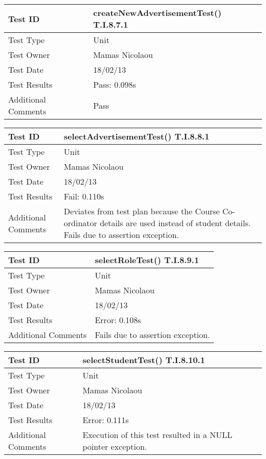 \documentclass{l3deliverable}
\begin{document}
\vspace{4 mm}

\begin{tabular}{|p{2cm}|p{12cm}|}
\hline
Test ID & createNewAdvertisementTest() T.I.8.7.1\\
\hline
Test Type & Unit\\
\hline
Test Owner  & Mamas Nicolaou\\
\hline
Test Date & 18/02/13\\
\hline
Test Results & Pass: 0.098s\\
\hline
Additional Comments & Pass\\
\hline
\end{tabular}

\vspace{4 mm}

\begin{tabular}{|p{2cm}|p{12cm}|}
\hline
Test ID & selectAdvertisementTest() T.I.8.8.1\\
\hline
Test Type & Unit\\
\hline
Test Owner  & Mamas Nicolaou\\
\hline
Test Date & 18/02/13\\
\hline
Test Results & Fail: 0.110s\\
\hline
Additional Comments & Deviates from test plan because the Course Co-ordinator details are used instead of student details. Fails due to assertion exception.\\
\hline
\end{tabular}

\vspace{4 mm}

\begin{tabular}{|p{2cm}|p{12cm}|}
\hline
Test ID & selectRoleTest() T.I.8.9.1\\
\hline
Test Type & Unit\\
\hline
Test Owner  & Mamas Nicolaou\\
\hline
Test Date & 18/02/13\\
\hline
Test Results & Error: 0.108s\\
\hline
Additional Comments & Fails due to assertion exception.\\
\hline
\end{tabular}

\vspace{4 mm}

\begin{tabular}{|p{2cm}|p{12cm}|}
\hline
Test ID & selectStudentTest() T.I.8.10.1\\
\hline
Test Type & Unit\\
\hline
Test Owner  & Mamas Nicolaou\\
\hline
Test Date & 18/02/13\\
\hline
Test Results & Error: 0.111s\\
\hline
Additional Comments & Execution of this test resulted in a NULL pointer exception.\\
\hline
\end{tabular}
\end{document}

